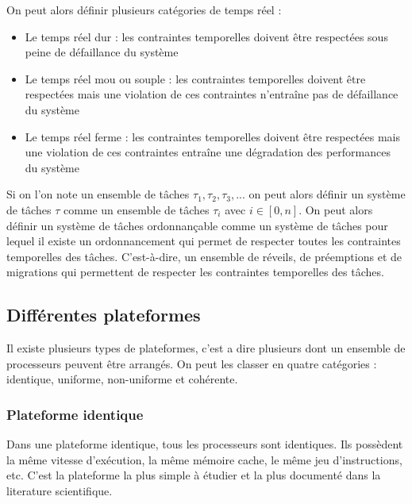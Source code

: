 On peut alors définir plusieurs catégories de temps réel :
\begin{itemize}
    \item Le temps réel dur : les contraintes temporelles doivent être respectées sous peine de défaillance du système
    \item Le temps réel mou ou souple : les contraintes temporelles doivent être respectées mais une violation de ces contraintes n'entraîne pas de défaillance du système
    \item Le temps réel ferme : les contraintes temporelles doivent être respectées mais une violation de ces contraintes entraîne une dégradation des performances du système
\end{itemize}


Si on l'on note un ensemble de tâches $\tau_1, \tau_2, \tau_3, ...$ on peut alors définir un système de tâches $\tau$ comme un ensemble de tâches $\tau_i$ avec $i \in \left[ 0,n \right]$. On peut alors définir un système de tâches ordonnançable comme un système de tâches pour lequel il existe un ordonnancement qui permet de respecter toutes les contraintes temporelles des tâches. C'est-à-dire, un ensemble de réveils, de préemptions et de migrations qui permettent de respecter les contraintes temporelles des tâches.




\subsection{Différentes plateformes}

Il existe plusieurs types de plateformes, c'est a dire plusieurs dont un ensemble de processeurs peuvent être arrangés. On peut les classer en quatre catégories : identique, uniforme, non-uniforme et cohérente.
\subsubsection{Plateforme identique}
Dans une plateforme identique, tous les processeurs sont identiques. Ils possèdent la même vitesse d'exécution, la même mémoire cache, le même jeu d'instructions, etc. C'est la plateforme la plus simple à étudier et la plus documenté dans la literature scientifique. 

